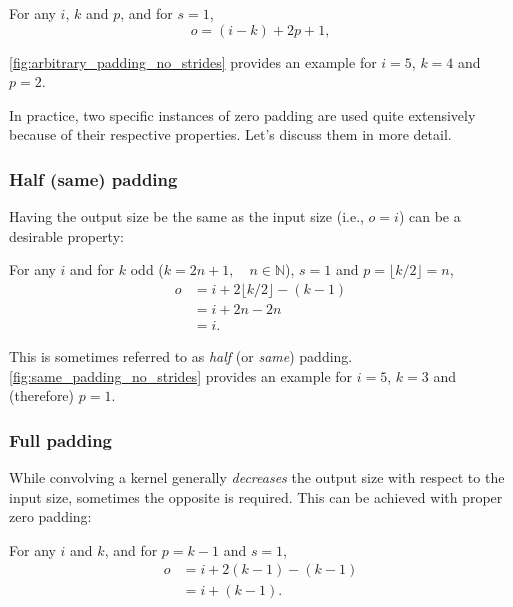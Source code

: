 \begin{relationship}\label{rel:arbitrary_padding_no_strides}
For any $i$, $k$ and $p$, and for $s = 1$,
\begin{equation*}
    o = (i - k) + 2p + 1,
\end{equation*}
\end{relationship}

\noindent \autoref{fig:arbitrary_padding_no_strides} provides an example for $i
= 5$, $k = 4$ and $p = 2$.

In practice, two specific instances of zero padding are used quite extensively
because of their respective properties. Let's discuss them in more detail.

\subsubsection{Half (same) padding}

Having the output size be the same as the input size (i.e., $o = i$) can be a
desirable property:

\begin{relationship}\label{rel:same_padding_no_strides}
For any $i$ and for $k$ odd ($k = 2n + 1, \quad n \in \mathbb{N}$), $s = 1$ and
$p = \lfloor k / 2 \rfloor = n$,
\begin{equation*}
\begin{split}
    o &= i + 2 \lfloor k / 2 \rfloor - (k - 1) \\
      &= i + 2n - 2n \\
      &= i.
\end{split}
\end{equation*}
\end{relationship}

\noindent This is sometimes referred to as {\em half\/} (or {\em same\/})
padding. \autoref{fig:same_padding_no_strides} provides an example for
$i = 5$, $k = 3$ and (therefore) $p = 1$.

\subsubsection{Full padding}

While convolving a kernel generally {\em decreases\/} the output size with
respect to the input size, sometimes the opposite is required. This can be
achieved with proper zero padding:

\begin{relationship}\label{rel:full_padding_no_strides}
For any $i$ and $k$, and for $p = k - 1$ and $s = 1$,
\begin{equation*}
\begin{split}
    o &= i + 2(k - 1) - (k - 1) \\
      &= i + (k - 1).
\end{split}
\end{equation*}
\end{relationship}

